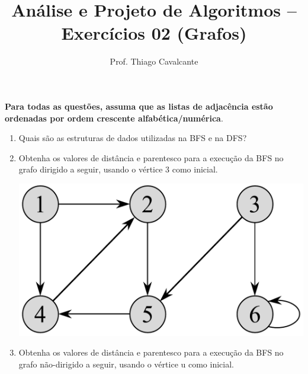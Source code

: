\documentclass[a4paper,11pt]{article}
\title{Análise e Projeto de Algoritmos -- Exercícios 02 (Grafos)}
\author{Prof. Thiago Cavalcante}
\date{}
\begin{document}
\maketitle

\sloppy
\raggedright

\setlength{\leftmargini}{0pt}

\textbf{Para todas as questões, assuma que as listas de adjacência estão ordenadas por ordem crescente alfabética/numérica}.

\begin{enumerate}
  \item Quais são as estruturas de dados utilizadas na BFS e na DFS?

  \item Obtenha os valores de distância e parentesco para a execução da BFS no grafo dirigido a seguir, usando o vértice 3 como inicial.

  \begin{center}
    \includegraphics[width=\textwidth]{graph2.png}
  \end{center}

  \item Obtenha os valores de distância e parentesco para a execução da BFS no grafo não-dirigido a seguir, usando o vértice u como inicial.


\end{enumerate}
\end{document}
